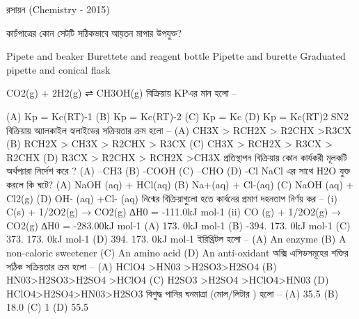 \documentclass[addpoints]{exam}
\begin{document}
\begin{LARGE}
\begin{center}
রসায়ন (Chemistry - 2015)
\end{center}
\end{LARGE}
\begin{questions}


\question  কাচঁপাত্রের কোন সেটটি সঠিকভাবে আয়তন মাপার উপযুক্ত?

\begin{oneparchoices}
\choice Pipete and beaker       
\choice Burettete and reagent bottle   
\choice Pipette and burette      
\choice Graduated pipette and conical flask
\end{oneparchoices}

\question  CO2(g) + 2H2(g) ⇌ CH3OH(g)  বিক্রিয়ায় KPএর মান হলো – 

(A) Kp = Kc(RT)-1                (B) Kp = Kc(RT)-2             (C)  Kp = Kc            (D) Kp = Kc(RT)2     
\question  SN2   বিক্রিয়ায় অ্যালকাইল হ্যলাইডের সক্রিয়তার ক্রম হলো – 
(A)  CH3X > RCH2X > R2CHX >R3CX          (B) RCH2X > CH3X > R2CHX > R3CX 
(C)  CH3X > RCH2X > R3CX > R2CHX         (D) R3CX > R2CHX > RCH2X >CH3X
\question  প্রতিস্থাপন বিক্রিয়ায় কোন কার্যকরী মূলকটি অর্থপ্যারা নির্দেশ করে ?
(A) –CH3                                (B)  -COOH                   (C)  –CHO                         (D) -Cl
\question  NaCl এর সাথে H2O যুক্ত করলে কি ঘটে?
(A) NaOH (aq) + HCl(aq)     (B)  Na+(aq) + Cl-(aq)    (C)  NaOH (aq) + Cl2(g)   (D) OH- (aq) +Cl- (aq)
\question  নিন্মের বিক্রিয়াগুলো হতে কার্বনের প্রমাণ দহনতাপ নির্ণয় কর –
(i) C(s) + 1/2O2(g) → CO2(g)  ∆H0 = -111.0kJ mol-1
(ii) CO (g) + 1/2O2(g) → CO2(g)  ∆H0 = -283.00kJ mol-1
(A)   173. 0kJ mol-1       (B)  -394. 173. 0kJ mol-1       (C)  373. 173. 0kJ mol-1    (D) 394. 173. 0kJ mol-1    
\question  ইরিথ্রিটল হলো – 
(A)  An enzyme    (B)  A non-caloric sweetener    (C)  An amino acid    (D)  An anti-oxidant
\question অক্সি এসিডসমূহের শক্তির সঠিক সক্রিয়তার ক্রম হলো – 
(A)  HClO4 >HN03 >H2SO3>H2SO4              (B) HN03>H2SO3>H2SO4 >HClO4   
(C)  H2SO3 >H2SO4 >HClO4>HN03             (D) HClO4>H2SO4>HN03>H2SO3
\question বিশুদ্ধ পানির ঘনমাত্রা (মোল/লিটার ) হলো – 
(A)  35.5           (B)   18.0          (C) 1           (D) 55.5



\end{questions}
\end{document}
